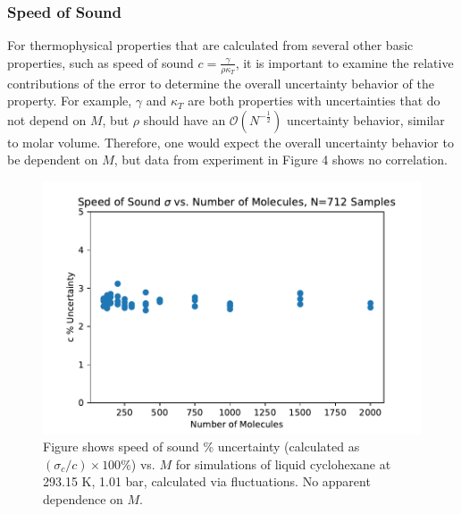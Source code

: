 \documentclass[aps,pre,twocolumn,nofootinbib,superscriptaddress,linenumbers,10pt, draft,tightenlines]{revtex4-1}
\begin{document}
\subsubsection{Speed of Sound}
For thermophysical properties that are calculated from several other basic properties, such as speed of sound $c=\frac{\gamma}{\rho \kappa_T}$, it is important to examine the relative contributions of the error to determine the overall uncertainty behavior of the property.  For example, $\gamma$ and $\kappa_T$ are both properties with uncertainties that do not depend on $M$, but $\rho$ should have an $\mathcal{O}(N^{-\frac{1}{2}})$ uncertainty behavior, similar to molar volume.  Therefore, one would expect the overall uncertainty behavior to be dependent on $M$, but data from experiment in Figure 4 shows no correlation. 
\begin{figure}[H]
\includegraphics[width=\textwidth-40pt]{c_stdev_vs_number_of_molecules.pdf}
\caption{Figure shows speed of sound \% uncertainty (calculated as $(\sigma_{c}/c) \times 100 \%$) vs. $M$ for simulations of liquid cyclohexane at 293.15 K, 1.01 bar, calculated via fluctuations. No apparent dependence on $M$.} 
\end{figure}
\end{document}
